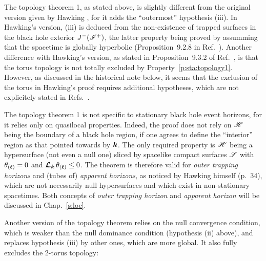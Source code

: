 \begin{remark}
The topology theorem 1, as stated above, is slightly different from the original
version given by Hawking \cite{Hawki72,Hawki73,HawkiE73}, for it adds the ``outermost'' hypothesis (iii). In Hawking's version, (iii) is deduced from the non-existence of
trapped surfaces in the black hole exterior $J^-(\mathscr{I}^+)$, the latter property
being proved by assumming that the spacetime is globally hyperbolic (Proposition~9.2.8
in Ref.~\cite{HawkiE73}).
Another difference with Hawking's version,
as stated in Proposition~9.3.2 of Ref.~\cite{HawkiE73}, is that
the torus topology is not totally excluded by Property~\ref{p:sta:topology1}.
However, as discussed in
the historical note below, it seems that the exclusion of the torus in
Hawking's proof requires additional hypotheses, which are not explicitely stated
in Refs.~\cite{Hawki72,HawkiE73}.
\end{remark}

\begin{remark}
The topology theorem 1 is not specific to stationary black hole event horizons, for
it relies only on quasilocal properties. Indeed, the proof does not rely on
$\mathscr{H}$ being the boundary of a black hole region, if one agrees to define the
``interior'' region as that pointed towards by $\bm{k}$. The only required property is
$\mathscr{H}$ being a hypersurface (not even a null one)
sliced by spacelike compact surfaces $\mathscr{S}$ with
$\theta_{(\bm{\ell})} = 0$ and $\bm{\mathcal{L}}_{\bm{k}}\, \theta_{(\bm{\ell})} \leq 0$.
The theorem is therefore valid for \emph{outer trapping horizons} \cite{Haywa94}
and (tubes of) \emph{apparent horizons}, as noticed by Hawking himself \cite{Hawki73} (p.~34),
which are not necessarily null hypersurfaces and which exist in non-stationary spacetimes.
Both concepts of \emph{outer trapping horizon} and \emph{apparent horizon}
will be discussed in Chap.~\ref{s:loc}.
\end{remark}

Another version of the topology theorem relies on the null convergence
condition, which is weaker than the null dominance condition (hypothesis (ii) above),
and replaces hypothesis (iii) by other ones, which are more global. It also
fully excludes the 2-torus topology:


